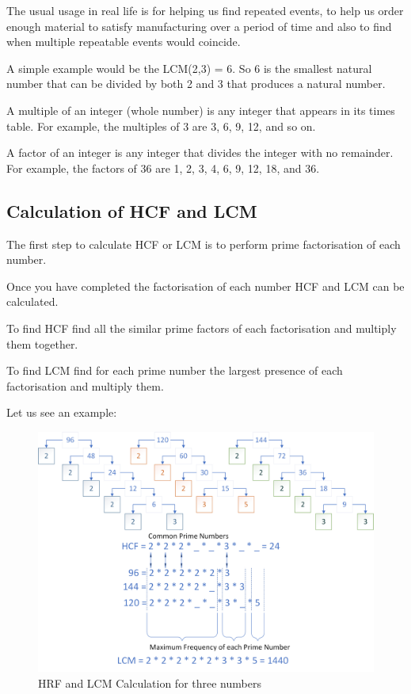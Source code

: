 \documentclass[
]{book}
\begin{document}
The usual usage in real life is for helping us find repeated events, to help us order enough material to satisfy manufacturing over a period of time and also to find when multiple repeatable events would coincide.

A simple example would be the LCM(2,3) = 6. So 6 is the smallest natural number that can be divided by both 2 and 3 that produces a natural number.

A multiple of an integer (whole number) is any integer that appears in its times table. For example, the multiples of 3 are 3, 6, 9, 12, and so on.

A factor of an integer is any integer that divides the integer with no remainder. For example, the factors of 36 are 1, 2, 3, 4, 6, 9, 12, 18, and 36.

\hypertarget{calculation-of-hcf-and-lcm}{%
\subsection{Calculation of HCF and LCM}\label{calculation-of-hcf-and-lcm}}

The first step to calculate HCF or LCM is to perform prime factorisation of each number.

Once you have completed the factorisation of each number HCF and LCM can be calculated.

To find HCF find all the similar prime factors of each factorisation and multiply them together.

To find LCM find for each prime number the largest presence of each factorisation and multiply them.

Let us see an example:

\begin{figure}

{\centering \includegraphics[width=1\linewidth]{images/HCF_LCM} 

}

\caption{HRF and LCM Calculation for three numbers}\label{fig:unnamed-chunk-7}
\end{figure}
\end{document}
